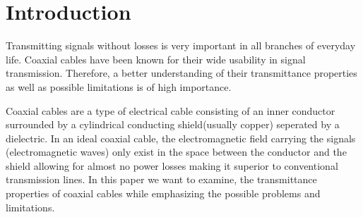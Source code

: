 \documentclass[a4paper,10pt,twocolumn]{article}
\begin{document}
    \section{Introduction}\label{sec:introduction}
    Transmitting signals without losses is very important in all branches of everyday life.
    Coaxial cables have been known for their wide usability in signal transmission.
    Therefore, a better understanding of their transmittance properties as well as possible limitations is of high importance.

    Coaxial cables are a type of electrical cable consisting of an inner conductor surrounded by a cylindrical conducting shield(usually copper) seperated by a dielectric. 
    In an ideal coaxial cable, the electromagnetic field carrying the signals (electromagnetic waves) only exist in the space between the conductor and the shield allowing for almost no power losses making it superior to conventional
    transmission lines.
    In this paper we want to examine, the transmittance properties of coaxial cables while emphasizing the possible problems and limitations.
    
\end{document}
